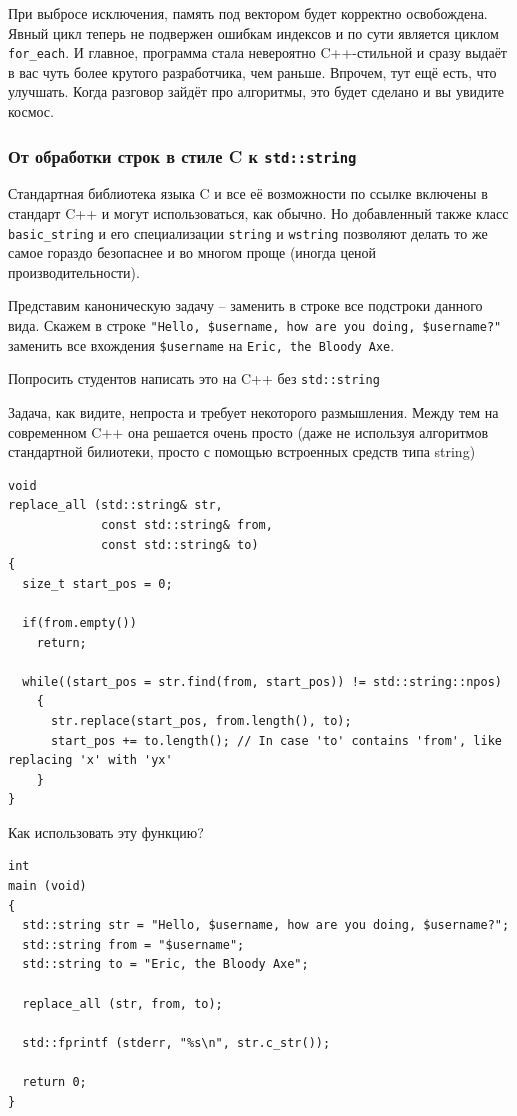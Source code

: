 \documentclass[a4paper,12pt,oneside]{article}
\begin{document}
При выбросе исключения, память под вектором будет корректно освобождена. Явный цикл теперь не подвержен ошибкам индексов и по сути является циклом \lstinline!for_each!. И главное, программа стала невероятно C++-стильной и сразу выдаёт в вас чуть более крутого разработчика, чем раньше. Впрочем, тут ещё есть, что улучшать. Когда разговор зайдёт про алгоритмы, это будет сделано и вы увидите космос.

\subsubsection{От обработки строк в стиле C к \lstinline!std::string!}\label{CStringToStdString}

Стандартная библиотека языка C и все её возможности по ссылке включены в стандарт C++ и могут использоваться, как обычно. Но добавленный также класс \lstinline!basic_string! и его специализации \lstinline!string! и \lstinline!wstring! позволяют делать то же самое гораздо безопаснее и во многом проще (иногда ценой производительности).

Представим каноническую задачу -- заменить в строке все подстроки данного вида. Скажем в строке \lstinline!"Hello, $username, how are you doing, $username?"! заменить все вхождения \lstinline!$username! на \lstinline!Eric, the Bloody Axe!.

Попросить студентов написать это на C++ без \lstinline!std::string!

Задача, как видите, непроста и требует некоторого размышления. Между тем на современном C++ она решается очень просто (даже не используя алгоритмов стандартной билиотеки, просто с помощью встроенных средств типа string)

\begin{lstlisting}
void
replace_all (std::string& str,
             const std::string& from,
             const std::string& to)
{
  size_t start_pos = 0;

  if(from.empty())
    return;

  while((start_pos = str.find(from, start_pos)) != std::string::npos)
    {
      str.replace(start_pos, from.length(), to);
      start_pos += to.length(); // In case 'to' contains 'from', like replacing 'x' with 'yx'
    }
}
\end{lstlisting}

Как использовать эту функцию?

\begin{lstlisting}
int
main (void)
{
  std::string str = "Hello, $username, how are you doing, $username?";
  std::string from = "$username";
  std::string to = "Eric, the Bloody Axe";

  replace_all (str, from, to);

  std::fprintf (stderr, "%s\n", str.c_str());

  return 0;
}
\end{lstlisting}
\end{document}
